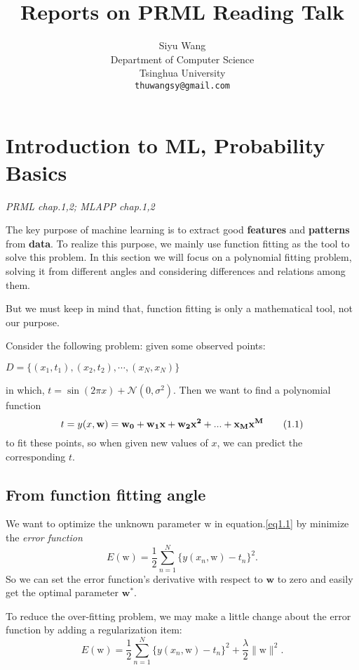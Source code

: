 \documentclass{article}
\title{Reports on PRML Reading Talk}
\author{
  Siyu Wang\\
  Department of Computer Science\\
  Tsinghua University\\
  \texttt{thuwangsy@gmail.com} \\
}
\newcommand{\norm}{\mathcal N}
\newcommand{\mbf}{\mathbf}
\newcommand{\mrm}{\mathrm}
\begin{document}

\maketitle

\section{Introduction to ML, Probability Basics}
\emph{PRML chap.1,2; MLAPP chap.1,2}

The key purpose of machine learning is to extract good \textbf{features} and \textbf{patterns} from \textbf{data}. To realize this purpose, we mainly use function fitting as the tool to solve this problem. In this section we will focus on a polynomial fitting problem, solving it from different angles and considering differences and relations among them. 

But we must keep in mind that, function fitting is only a mathematical tool, not our purpose.

Consider the following problem: given some observed points:
\begin{center}
$D=\{(x_1,t_1),(x_2,t_2), \cdots, (x_N,x_N)\}$
\end{center}
in which, $t = \sin(2\pi x)+\norm(0, \sigma^2)$. Then we want to find a polynomial function
\begin{equation}\label{eq1.1}
    t = y(x,\bf{w})= w_0+w_1x+w_2x^2+...+x_M x^M \tag{1.1}
\end{equation}
to fit these points, so when given new values of $x$, we can predict the corresponding $t$.

\subsection*{From function fitting angle}
We want to optimize the unknown parameter $\mrm{w}$ in equation.\ref{eq1.1} by minimize the \emph{error function}
\begin{equation}\label{eq1.2}
    E(\mrm w) = \frac12\sum_{n=1}^N\{y(x_n, \mrm w)-t_n\}^2.\tag{1.2}
\end{equation}
So we can set the error function's derivative with respect to $\textbf{w}$ to zero and easily get the optimal parameter $\mbf{w}^*$. 

To reduce the over-fitting problem, we may make a little change about the error function by adding a regularization item:
\begin{equation}\label{eq1.3}
    E(\mrm w) = \frac12\sum_{n=1}^N\{y(x_n, \mrm w)-t_n\}^2 + \frac{\lambda}{2}\|\mrm w\|^2. \tag{1.3}
\end{equation}
\end{document}
